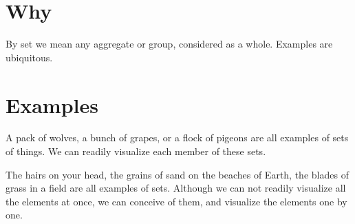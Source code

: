 
\section*{Why}

By set we mean any aggregate or group, considered as a whole.
Examples are ubiquitous.

\section*{Examples}

A pack of wolves, a bunch of grapes, or a flock of pigeons are all examples of sets of things.
We can readily visualize each member of these sets.

The hairs on your head, the grains of sand on the beaches of Earth, the blades of grass in a field are all examples of sets.
Although we can not readily visualize all the elements at once, we can conceive of them, and visualize the elements one by one.

\blankpage